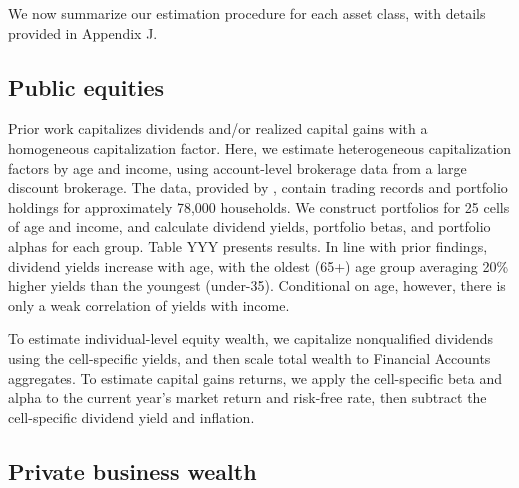 \documentclass[12pt]{article}
\begin{document}
We now summarize our estimation procedure for each asset class, with details provided in Appendix J. 

\subsection{Public equities}

Prior work capitalizes dividends and/or realized capital gains with a homogeneous capitalization factor. Here, we estimate heterogeneous capitalization factors by age and income, using account-level brokerage data from a large discount brokerage. The data, provided by \citet{barber2000trading}, contain trading records and portfolio holdings for approximately 78,000 households. We construct portfolios for 25 cells of age and income, and calculate dividend yields, portfolio betas, and portfolio alphas for each group. Table YYY presents results. In line with prior findings, dividend yields increase with age, with the oldest (65+) age group averaging 20\% higher yields than the youngest (under-35). Conditional on age, however, there is only a weak correlation of yields with income.

To estimate individual-level equity wealth, we capitalize nonqualified dividends using the cell-specific yields, and then scale total wealth to Financial Accounts aggregates. To estimate capital gains returns, we apply the cell-specific beta and alpha to the current year's market return and risk-free rate, then subtract the cell-specific dividend yield and inflation.







\subsection{Private business wealth} 
\end{document}
